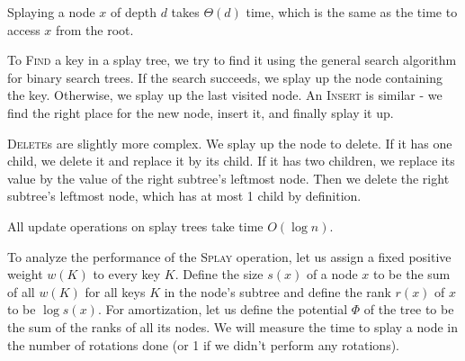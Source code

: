 Splaying a node $x$ of depth $d$ takes $\Theta(d)$ time, which is the same
as the time to access $x$ from the root.

To \textsc{Find} a key in a splay tree, we try to find it using the general
search algorithm for binary search trees. If the search succeeds, we splay
up the node containing the key. Otherwise, we splay up the last visited
node.
An \textsc{Insert} is similar - we find the right place for the new node,
insert it, and finally splay it up.

\textsc{Delete}s are slightly more complex. We splay up the node to delete.
If it has one child, we delete it and replace it by its child. If it has
two children, we replace its value by the value of the right subtree's
leftmost node. Then we delete the right subtree's leftmost node, which has at
most 1 child by definition.

All update operations on splay trees take time $O(\log n)$.

To analyze the performance of the \textsc{Splay} operation, let us assign
a fixed positive weight $w(K)$ to every key $K$. Define the size $s(x)$
of a node $x$ to be the sum of all $w(K)$ for all keys $K$ in the node's
subtree and define the rank $r(x)$ of $x$ to be $\log s(x)$.
For amortization, let us define the potential $\Phi$ of the tree to be
the sum of the ranks of all its nodes.
We will measure the time to splay a node in the number of rotations done
(or 1 if we didn't perform any rotations).

